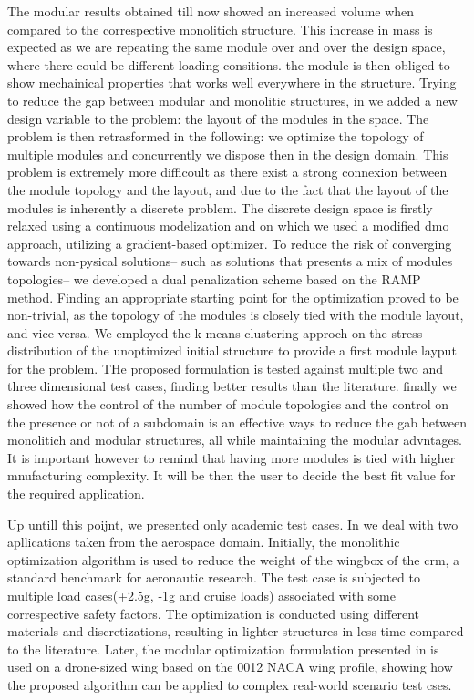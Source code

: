 The modular results obtained till now showed an increased volume when compared to the correspective monolitich structure. This increase in mass is expected as we are repeating the same module over and over the design space, where there could be different loading consitions. the module is then obliged to show mechainical properties that works well everywhere in the structure. Trying to reduce the gap between modular and monolitic structures, in \chpref{} we added a new design variable to the problem: the layout of the modules in the space. The problem is then retrasformed in the following: we optimize the topology of multiple modules and concurrently we dispose then in the design domain. This problem is extremely more difficoult as there exist a strong connexion between the module topology and the layout, and due to the fact that the layout of the modules is inherently a discrete problem. The discrete design space is firstly relaxed using a continuous modelization and on which we used a modified \gls{dmo} approach, utilizing a gradient-based optimizer. To reduce the risk of converging towards non-pysical solutions-- such as solutions that presents a mix of modules topologies-- we developed a dual penalization scheme based on the RAMP method. Finding an appropriate starting point for the optimization proved to be non-trivial, as the topology of the modules is closely tied with the module layout, and vice versa. We employed the k-means clustering approch on the stress distribution of the unoptimized initial structure to provide a first module layput for the problem. THe proposed formulation is tested against multiple two and three dimensional test cases, finding better results than the literature. finally we showed how the control of the number of module topologies and the control on the presence or not of a subdomain is an effective ways to reduce the gab between monolitich and modular structures, all while maintaining the modular advntages. It is important however to remind that having more modules is tied with higher mnufacturing complexity. It will be then the user to decide the best fit value for the required application.

Up untill this poijnt, we presented only academic test cases. In \chpref{} we deal with two apllications taken from the aerospace domain. Initially, the monolithic optimization algorithm is used to reduce the weight of the wingbox of the \gls{crm}, a standard benchmark for aeronautic research. The test case is subjected to multiple load cases(+2.5g, -1g and cruise loads) associated with some correspective safety factors. The optimization is conducted using different materials and discretizations, resulting in lighter structures in less time compared to the literature. Later, the modular optimization formulation presented in  is used on a drone-sized wing based on the 0012 NACA wing profile, showing how the proposed algorithm can be applied to complex real-world scenario test cses.

